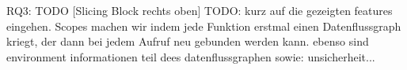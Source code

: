 \begin{frame}[c]{RQ3: TODO [Slicing Block rechts oben]}
   \centering
   TODO: kurz auf die gezeigten features eingehen.
   Scopes machen wir indem jede Funktion erstmal einen Datenflussgraph kriegt, der dann bei jedem Aufruf neu gebunden werden kann. ebenso sind environment informationen teil dees datenflussgraphen
   sowie: unsicherheit...
\end{frame}

